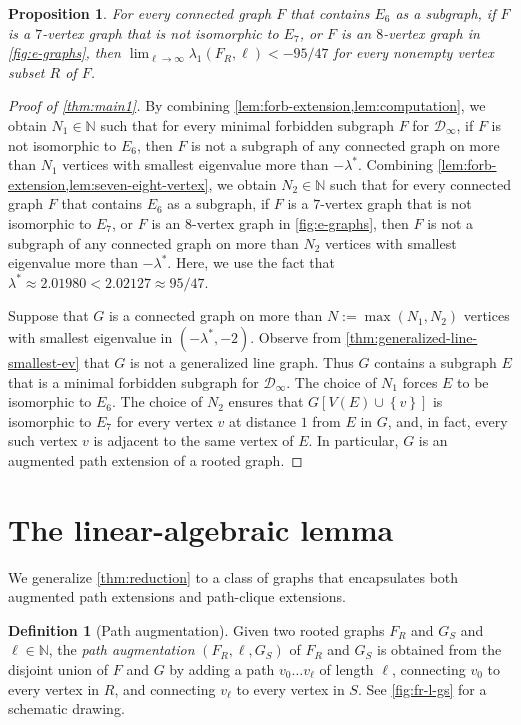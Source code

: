\documentclass[11pt]{article}
\newtheorem{proposition}[theorem]{Proposition}
\theoremstyle{definition}
\newtheorem{definition}[theorem]{Definition}
\theoremstyle{remark}
\newcommand{\sset}[1]{\left\{{#1}\right\}}
\newcommand{\la}{\lambda}
\newcommand{\las}{\lambda^*}
\newcommand{\D}{\mathcal{D}}
\newcommand{\N}{\mathbb{N}}
\begin{document}
\begin{proposition} \label{lem:seven-eight-vertex}
    For every connected graph $F$ that contains $E_6$ as a subgraph, if $F$ is a $7$-vertex graph that is not isomorphic to $E_7$, or $F$ is an $8$-vertex graph in \cref{fig:e-graphs}, then $\lim_{\ell \to \infty} \la_1(F_R, \ell) < -95/47$ for every nonempty vertex subset $R$ of $F$.
\end{proposition}

\begin{proof}[Proof of \cref{thm:main1}] \label{proof:main1}
    By combining \cref{lem:forb-extension,lem:computation}, we obtain $N_1 \in \N$ such that for every minimal forbidden subgraph $F$ for $\D_\infty$, if $F$ is not isomorphic to $E_6$, then $F$ is not a subgraph of any connected graph on more than $N_1$ vertices with smallest eigenvalue more than $-\las$. Combining \cref{lem:forb-extension,lem:seven-eight-vertex}, we obtain $N_2 \in \N$ such that for every connected graph $F$ that contains $E_6$ as a subgraph, if $F$ is a $7$-vertex graph that is not isomorphic to $E_7$, or $F$ is an $8$-vertex graph in \cref{fig:e-graphs}, then $F$ is not a subgraph of any connected graph on more than $N_2$ vertices with smallest eigenvalue more than $-\las$. Here, we use the fact that $\las \approx 2.01980 < 2.02127 \approx 95/47$.

    Suppose that $G$ is a connected graph on more than $N := \max(N_1, N_2)$ vertices with smallest eigenvalue in $(-\las,-2)$. Observe from \cref{thm:generalized-line-smallest-ev} that $G$ is not a generalized line graph. Thus $G$ contains a subgraph $E$ that is a minimal forbidden subgraph for $\D_\infty$. The choice of $N_1$ forces $E$ to be isomorphic to $E_6$. The choice of $N_2$ ensures that $G[V(E) \cup \sset{v}]$ is isomorphic to $E_7$ for every vertex $v$ at distance $1$ from $E$ in $G$, and, in fact, every such vertex $v$ is adjacent to the same vertex of $E$. In particular, $G$ is an augmented path extension of a rooted graph.
\end{proof}

\section{The linear-algebraic lemma} \label{sec:lin-alg}

We generalize \cref{thm:reduction} to a class of graphs that encapsulates both augmented path extensions and path-clique extensions.

\begin{definition}[Path augmentation]
    Given two rooted graphs $F_R$ and $G_S$ and $\ell \in \N$, the \emph{path augmentation} $(F_R, \ell, G_S)$ of $F_R$ and $G_S$ is obtained from the disjoint union of $F$ and $G$ by adding a path $v_0\dots v_\ell$ of length $\ell$, connecting $v_0$ to every vertex in $R$, and connecting $v_\ell$ to every vertex in $S$. See \cref{fig:fr-l-gs} for a schematic drawing.
\end{definition}
\end{document}
